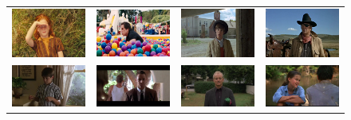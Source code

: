 \begin{figure}
\begin{center}
\begin{tabular}{cccc}
\includegraphics[width=0.2\linewidth]
  {fig/clust/05.jpg} 
& \includegraphics[width=0.2\linewidth]
  {fig/clust/07.jpg}  
& \includegraphics[width=0.2\linewidth]
  {fig/clust/13.jpg}   
& \includegraphics[width=0.2\linewidth]
  {fig/clust/14.jpg}
\\
\includegraphics[width=0.2\linewidth]
  {fig/clust/01.jpg} 
& \includegraphics[width=0.2\linewidth]
  {fig/clust/06.jpg}  
& \includegraphics[width=0.2\linewidth]
  {fig/clust/02.jpg}   
& \includegraphics[width=0.2\linewidth]
  {fig/clust/08.jpg}
\\


\end{tabular}
\end{center}
\end{figure}
